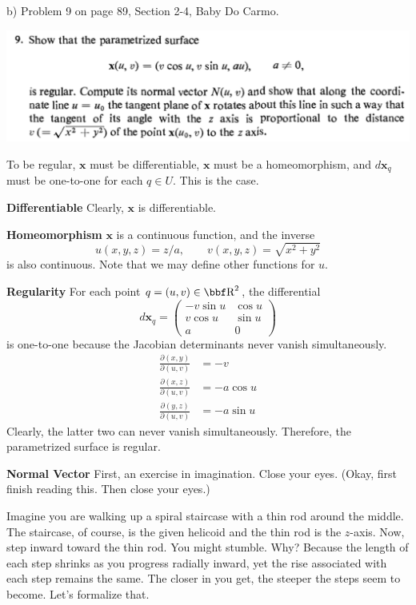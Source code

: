 \documentclass[10pt,letterpaper]{hmcpset}
\begin{document}
\newpage
\begin{problem}
 b) Problem 9 on page 89, Section 2-4, Baby Do Carmo.
 
 \includegraphics[scale=0.7]{Cb.png}
\end{problem}
\begin{solution}
To be regular, $\mathbf{x}$ must be differentiable, $\mathbf{x}$ must be a homeomorphism, and $d\mathbf{x}_q$ must be one-to-one for each $q \in U$. This is the case.

\textbf{Differentiable}
Clearly, $\mathbf{x}$ is differentiable.

\textbf{Homeomorphism}
$\mathbf{x}$ is a continuous function, and the inverse
\[
u(x,y,z) = z/a, \qquad v(x,y,z) = \sqrt{x^2 + y^2}
\]
is also continuous. Note that we may define other functions for $u$.

\textbf{Regularity}
For each point $q = (u,v) \in \RR^2$, the differential \[
d\mathbf{x}_q = 
\begin{pmatrix}
-v \sin u &\cos u\\
v \cos u & \sin u\\
a &0
\end{pmatrix}
\]
is one-to-one because the Jacobian determinants never vanish simultaneously.
\begin{align*}
    \frac{\partial(x,y)}{\partial(u,v)} &= -v \tag{Vanishes iff $v=0$.}\\
    \frac{\partial(x,z)}{\partial(u,v)} &= -a \cos u
    \tag{Vanishes iff $u = 2\pi n + \pi$.}\\
    \frac{\partial(y,z)}{\partial(u,v)} &= -a \sin u
    \tag{Vanishes iff $u = 2\pi n$.}
\end{align*}
Clearly, the latter two can never vanish simultaneously.
Therefore, the parametrized surface is regular.

\textbf{Normal Vector}
First, an exercise in imagination. Close your eyes. (Okay,  first finish reading this. Then close your eyes.) 

Imagine you are walking up a spiral staircase with a thin rod around the middle. The staircase, of course, is the given helicoid and the thin rod is the $z$-axis. Now, step inward toward the thin rod. You might stumble. Why? Because the length of each step shrinks as you progress radially inward, yet the rise associated with each step remains the same. The closer in you get, the steeper the steps seem to become. Let's formalize that.


\end{solution}
\end{document}
